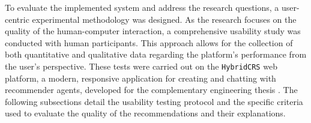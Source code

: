 To evaluate the implemented system and address the research questions, a user-centric experimental methodology was designed. As the research focuses on the quality of the human-computer interaction, a comprehensive usability study was conducted with human participants. This approach allows for the collection of both quantitative and qualitative data regarding the platform's performance from the user's perspective. These tests were carried out on the \texttt{HybridCRS} web platform, a modern, responsive application for creating and chatting with recommender agents, developed for the complementary engineering thesis \cite{MUII-THESIS}. The following subsections detail the usability testing protocol and the specific criteria used to evaluate the quality of the recommendations and their explanations.